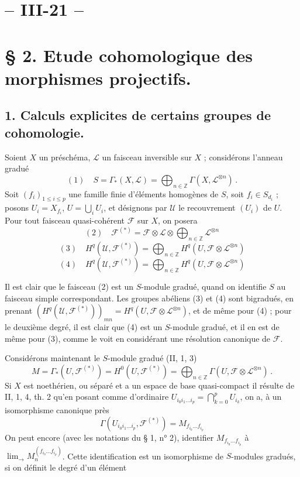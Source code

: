 \newpage



\section*{-- III-21 --}

\section*{§ 2. Etude cohomologique des morphismes projectifs.}

\subsection*{1. Calculs explicites de certains groupes de cohomologie.}

Soient $X$ un préschéma, $\mathcal{L}$ un faisceau inversible sur $X$ ; considérons l'anneau gradué
$$(1) \quad S = \Gamma_*(X, \mathcal{L}) = \bigoplus_{n \in \mathbb{Z}} \Gamma(X, \mathcal{L}^{\otimes n}) \, .$$
Soit $(f_i)_{1 \le i \le p}$ une famille finie d'éléments homogènes de $S$, soit $f_i \in S_{d_i}$ ; posons $U_i = X_{f_i}$, $U = \bigcup_i U_i$, et désignons par $\mathcal{U}$ le recouvrement $(U_i)$ de $U$. Pour tout faisceau quasi-cohérent $\mathcal{F}$ sur $X$, on posera
$$(2) \quad \mathcal{F}^{(*)} = \mathcal{F} \otimes \mathcal{L} \otimes \bigoplus_{n \in \mathbb{Z}} \mathcal{L}^{\otimes n}$$
$$(3) \quad H^q(\mathcal{U}, \mathcal{F}^{(*)}) = \bigoplus_{n \in \mathbb{Z}} H^q(U, \mathcal{F} \otimes \mathcal{L}^{\otimes n})$$
$$(4) \quad H^q(\mathcal{U}, \mathcal{F}^{(*)}) = \bigoplus_{n \in \mathbb{Z}} H^q(U, \mathcal{F} \otimes \mathcal{L}^{\otimes n})$$

Il est clair que le faisceau (2) est un $S$-module gradué, quand on identifie $S$ au faisceau simple correspondant. Les groupes abéliens (3) et (4) sont bigradués, en prenant $(H^q(\mathcal{U}, \mathcal{F}^{(*)}))_{mn} = H^q(U, \mathcal{F} \otimes \mathcal{L}^{\otimes n})$, et de même pour (4) ; pour le deuxième degré, il est clair que (4) est un $S$-module gradué, et il en est de même pour (3), comme le voit en considérant une résolution canonique de $\mathcal{F}$.

Considérons maintenant le $S$-module gradué (II, 1, 3)
$$M = \Gamma_*(U, \mathcal{F}^{(*)}) = H^0(U, \mathcal{F}^{(*)}) = \bigoplus_{n \in \mathbb{Z}} \Gamma(U, \mathcal{F} \otimes \mathcal{L}^{\otimes n}) \, .$$
Si $X$ est noethérien, ou séparé et a un espace de base quasi-compact il résulte de II, 1, 4, th. 2 qu'en posant comme d'ordinaire $U_{i_0 i_1 \dots i_p} = \bigcap_{k=0}^p U_{i_k}$, on a, à un isomorphisme canonique près
$$\Gamma(U_{i_0 i_1 \dots i_p}, \mathcal{F}^{(*)}) = M_{f_{i_0} \dots f_{i_p}}$$
On peut encore (avec les notations du § 1, n° 2), identifier $M_{f_{i_0} \dots f_{i_p}}$ à $\lim_{\longrightarrow} M_n^{(f_{i_0} \dots f_{i_p})}$. Cette identification est un isomorphisme de $S$-modules gradués, si on définit le degré d'un élément

